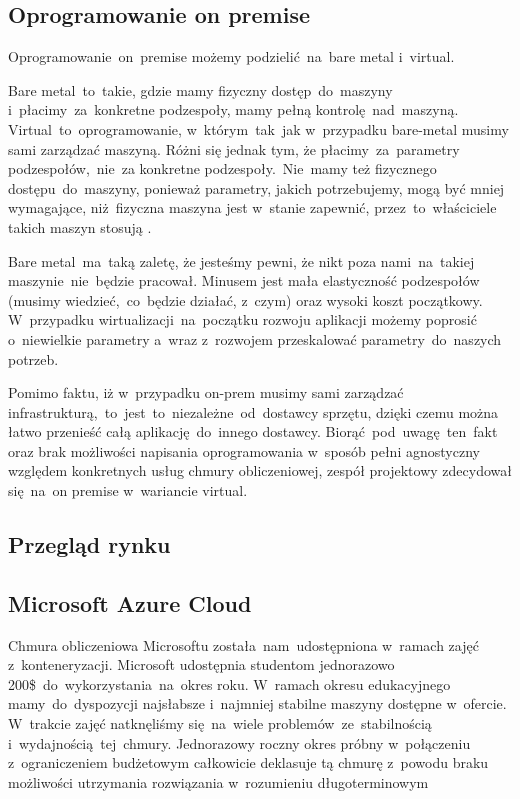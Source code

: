 \subsection{Oprogramowanie on premise}\label{subsec:oprogramowanie-on-premise}
Oprogramowanie~on~premise możemy podzielić~na~bare metal i~virtual.

Bare metal~to~takie, gdzie mamy fizyczny dostęp~do~maszyny i~płacimy~za~konkretne podzespoły, mamy pełną kontrolę~nad~maszyną.
Virtual~to~oprogramowanie, w~którym~tak~jak w~przypadku bare-metal musimy sami zarządzać maszyną.
Różni się jednak tym, że płacimy~za~parametry podzespołów,~nie~za konkretne podzespoły.~Nie~mamy też fizycznego dostępu~do~maszyny, ponieważ parametry, jakich potrzebujemy, mogą być mniej wymagające, niż~fizyczna maszyna jest w~stanie zapewnić, przez~to~właściciele takich maszyn stosują .

Bare metal~ma~taką zaletę, że jesteśmy pewni, że nikt poza nami~na~takiej maszynie~nie~będzie pracował.
Minusem jest mała elastyczność podzespołów (musimy wiedzieć,~co~będzie działać, z~czym) oraz wysoki koszt początkowy.
W~przypadku wirtualizacji~na~początku rozwoju aplikacji możemy poprosić o~niewielkie parametry a~wraz z~rozwojem przeskalować parametry~do~naszych potrzeb.

Pomimo faktu, iż w~przypadku \gls{on-prem} musimy sami zarządzać infrastrukturą,~to~jest~to~niezależne~od~dostawcy sprzętu, dzięki czemu można łatwo przenieść całą aplikację~do~innego dostawcy.
Biorąć~pod~uwagę~ten~fakt oraz brak możliwości napisania oprogramowania w~sposób pełni agnostyczny względem konkretnych usług chmury obliczeniowej, zespół projektowy zdecydował się~na~on premise w~wariancie virtual.

\subsection{Przegląd rynku}\label{subsec:przeglad-rynku}

\subsection{Microsoft Azure Cloud}\label{subsec:microsoft-azure-cloud}
Chmura obliczeniowa Microsoftu została~nam~udostępniona w~ramach zajęć z~konteneryzacji.
Microsoft udostępnia studentom jednorazowo 200\$~do~wykorzystania~na~okres roku.
W~ramach okresu edukacyjnego mamy~do~dyspozycji najsłabsze i~najmniej stabilne maszyny dostępne w~ofercie.
W~trakcie zajęć natknęliśmy się~na~wiele problemów~ze~stabilnością i~wydajnością~tej~chmury.
Jednorazowy roczny okres próbny w~połączeniu z~ograniczeniem budżetowym całkowicie deklasuje tą chmurę z~powodu braku możliwości utrzymania rozwiązania w~rozumieniu długoterminowym

